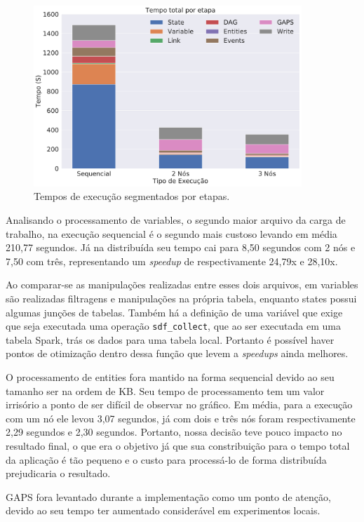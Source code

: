 \begin{figure}[H]
\centerline{
\includegraphics[width=0.9\textwidth]{./img/total_step.pdf}}
 \caption{Tempos de execução segmentados por etapas.}
 \label{fig:total_step}
\end{figure}

Analisando o processamento de variables, o segundo maior arquivo da carga de 
trabalho, na execução sequencial é o segundo mais custoso levando em média 
210,77 segundos. Já na distribuída seu tempo cai para 8,50 segundos com 2 nós e 
7,50 com três, representando um \emph{speedup} de respectivamente 24,79x e 
28,10x.

Ao comparar-se as manipulações realizadas entre esses dois arquivos, em 
variables são realizadas filtragens e manipulações na própria tabela, enquanto 
states possui algumas junções de tabelas. Também há a definição de uma variável 
que exige que seja executada uma operação \texttt{sdf\_collect}, que ao ser 
executada em uma tabela Spark, trás os dados para uma tabela local. Portanto é 
possível haver pontos de otimização dentro dessa função que levem a 
\emph{speedups} ainda melhores.

O processamento de entities fora mantido na forma sequencial devido ao seu 
tamanho ser na ordem de KB. Seu tempo de processamento tem um valor irrisório 
a ponto de ser difícil de observar no gráfico. Em média, para a execução com 
um nó ele levou 3,07 segundos, já com dois e três nós foram respectivamente 
2,29 segundos e 2,30 segundos. Portanto, nossa decisão teve pouco impacto no 
resultado final, o que era o objetivo já que sua constribuição para o tempo 
total da aplicação é tão pequeno e o custo para processá-lo de forma 
distribuída prejudicaria o resultado.

GAPS fora levantado durante a implementação como um ponto de atenção, devido ao 
seu tempo ter aumentado considerável em experimentos locais. 



















